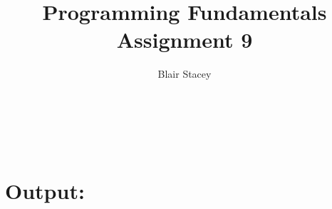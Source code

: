\documentclass{article}
\author{Blair Stacey}
\begin{document}
\title{Programming Fundamentals Assignment 9}

\maketitle

\section{}
\begin{verbatim}

\end{verbatim}
\section{}
\begin{verbatim}

\end{verbatim}
\section{Output:}
\end{document}
